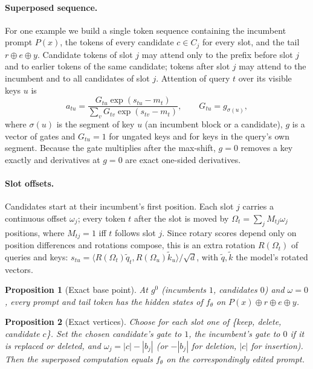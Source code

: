 \documentclass{article}
\newtheorem{proposition}{Proposition}
\begin{document}
\paragraph{Superposed sequence.} For one example we build a single token sequence
containing the incumbent prompt $P(x)$, the tokens of every candidate $c\in C_j$
for every slot, and the tail $r\oplus e\oplus y$. Candidate tokens of slot $j$ may
attend only to the prefix before slot $j$ and to earlier tokens of the same
candidate; tokens after slot $j$ may attend to the incumbent and to all candidates
of slot $j$. Attention of query $t$ over its visible keys $u$ is
\begin{equation}
a_{tu}=\frac{G_{tu}\exp(s_{tu}-m_t)}{\sum_{v}G_{tv}\exp(s_{tv}-m_t)},\qquad
G_{tu}=g_{\sigma(u)},
\label{eq:gate}
\end{equation}
where $\sigma(u)$ is the segment of key $u$ (an incumbent block or a candidate),
$g$ is a vector of gates and $G_{tu}=1$ for ungated keys and for keys in the
query's own segment. Because the gate multiplies after the max-shift, $g=0$
removes a key exactly and derivatives at $g=0$ are exact one-sided derivatives.

\paragraph{Slot offsets.} Candidates start at their incumbent's first position.
Each slot $j$ carries a continuous offset $\omega_j$; every token $t$ after the
slot is moved by $\Omega_t=\sum_j M_{tj}\omega_j$ positions, where $M_{tj}=1$ iff
$t$ follows slot $j$. Since rotary scores depend only on position differences and
rotations compose, this is an extra rotation $R(\Omega_t)$ of queries and keys:
$s_{tu}=\langle R(\Omega_t)\tilde q_t, R(\Omega_u)\tilde k_u\rangle/\sqrt d$, with
$\tilde q,\tilde k$ the model's rotated vectors.

\begin{proposition}[Exact base point]
At $g^0$ (incumbents $1$, candidates $0$) and $\omega=0$, every prompt and tail
token has the hidden states of $f_\theta$ on $P(x)\oplus r\oplus e\oplus y$.
\end{proposition}

\begin{proposition}[Exact vertices]
Choose for each slot one of \{keep, delete, candidate $c$\}. Set the chosen
candidate's gate to $1$, the incumbent's gate to $0$ if it is replaced or deleted,
and $\omega_j=|c|-|b_j|$ (or $-|b_j|$ for deletion, $|c|$ for insertion). Then the
superposed computation equals $f_\theta$ on the correspondingly edited prompt.
\end{proposition}
\end{document}
